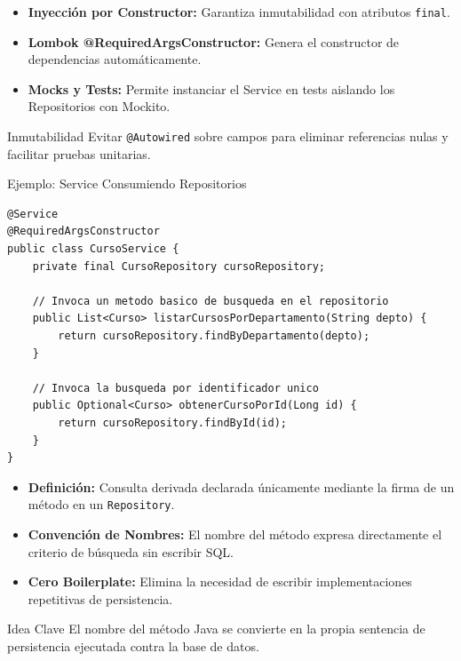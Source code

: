 \documentclass[aspectratio=169]{beamer}
\begin{document}
  {
    \begin{itemize}
      \item \textbf{Inyecci\'on por Constructor:} Garantiza inmutabilidad con atributos \texttt{final}.
      \item \textbf{Lombok @RequiredArgsConstructor:} Genera el constructor de dependencias autom\'aticamente.
      \item \textbf{Mocks y Tests:} Permite instanciar el Service en tests aislando los Repositorios con Mockito.
    \end{itemize}
  }
  {Inmutabilidad}
  {Evitar \texttt{@Autowired} sobre campos para eliminar referencias nulas y facilitar pruebas unitarias.}

\begin{frame}[fragile]{Ejemplo: Service Consumiendo Repositorios}
\begin{lstlisting}[style=SpringCodeStyle]
@Service
@RequiredArgsConstructor
public class CursoService {
    private final CursoRepository cursoRepository;

    // Invoca un metodo basico de busqueda en el repositorio
    public List<Curso> listarCursosPorDepartamento(String depto) {
        return cursoRepository.findByDepartamento(depto);
    }

    // Invoca la busqueda por identificador unico
    public Optional<Curso> obtenerCursoPorId(Long id) {
        return cursoRepository.findById(id);
    }
}
\end{lstlisting}
\end{frame}



  {
    \begin{itemize}
      \item \textbf{Definici\'on:} Consulta derivada declarada \'unicamente mediante la firma de un m\'etodo en un \texttt{Repository}.
      \item \textbf{Convenci\'on de Nombres:} El nombre del m\'etodo expresa directamente el criterio de b\'usqueda sin escribir SQL.
      \item \textbf{Cero Boilerplate:} Elimina la necesidad de escribir implementaciones repetitivas de persistencia.
    \end{itemize}
  }
  {Idea Clave}
  {El nombre del m\'etodo Java se convierte en la propia sentencia de persistencia ejecutada contra la base de datos.}
\end{document}
